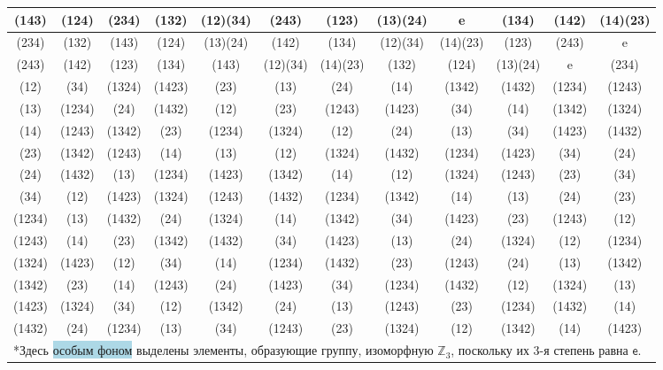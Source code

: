 \documentclass[11pt]{book}
\theoremstyle{mythm}
\theoremstyle{mydef}
\numberwithin{upr}{chapter}
\newcommand{\e}{\mathsf e}
\newcommand{\Z}{\mathbb Z}
\begin{document}
\begin{table}[h!]
\begin{tabular}{c|ccccccccccc}
(143) & (124) & (234) & (132) & (12)(34) & (243) & (123) & (13)(24) & \cellcolor{lightBlue}e & \cellcolor{lightBlue}(134) & (142) & (14)(23) \\ \hline\rowcolor{lightGreen}
(234) & (132) & (143) & (124) & (13)(24) & (142) & (134) & (12)(34) & (14)(23) & (123) & \cellcolor{lightBlue}(243) & \cellcolor{lightBlue}e \\ \hline\rowcolor{lightGreen}
(243) & (142) & (123) & (134) & (143) & (12)(34) & (14)(23) & (132) & (124) & (13)(24) & \cellcolor{lightBlue}e & \cellcolor{lightBlue}(234) \\ \hline
\cellcolor{yellow}(12) &\cellcolor{yellow} (34) &\cellcolor{yellow} (1324) &\cellcolor{yellow} (1423) & (23) & (13) & (24) & (14) & (1342) & (1432) & (1234) & (1243) \\ \hline
(13) & (1234) & (24) & (1432) & (12) & (23) & (1243) & (1423) & (34) & (14) & (1342) & (1324) \\ \hline
(14) & (1243) & (1342) & (23) & (1234) & (1324) & (12) & (24) & (13) & (34) & (1423) & (1432) \\ \hline
(23) & (1342) & (1243) & (14) & (13) & (12) & (1324) & (1432) & (1234) & (1423) & (34) & (24) \\ \hline
(24) & (1432) & (13) & (1234) & (1423) & (1342) & (14) & (12) & (1324) & (1243) & (23) & (34) \\ \hline
\cellcolor{yellow}(34) &\cellcolor{yellow} (12) &\cellcolor{yellow} (1423) &\cellcolor{yellow} (1324) & (1243) & (1432) & (1234) & (1342) & (14) & (13) & (24) & (23) \\ \hline
(1234) & (13) & (1432) & (24) & (1324) & (14) & (1342) & (34) & (1423) & (23) & (1243) & (12) \\ \hline
(1243) & (14) & (23) & (1342) & (1432) & (34) & (1423) & (13) & (24) & (1324) & (12) & (1234) \\ \hline
\cellcolor{yellow}(1324) & \cellcolor{yellow}(1423) &\cellcolor{yellow} (12) &\cellcolor{yellow} (34) & (14) & (1234) & (1432) & (23) & (1243) & (24) & (13) & (1342) \\ \hline
(1342) & (23) & (14) & (1243) & (24) & (1423) & (34) & (1234) & (1432) & (12) & (1324) & (13) \\ \hline
\cellcolor{yellow}(1423) &\cellcolor{yellow} (1324) &\cellcolor{yellow} (34) &\cellcolor{yellow} (12) & (1342) & (24) & (13) & (1243) & (23) & (1234) & (1432) & (14) \\ \hline
(1432) & (24) & (1234) & (13) & (34) & (1243) & (23) & (1324) & (12) & (1342) & (14) & (1423) \\ \hline
\multicolumn{12}{l}{*Здесь \colorbox{lightBlue}{особым фоном} выделены элементы, образующие группу, изоморфную $\Z_3$, поскольку их 3-я степень равна $\e$.}
\end{tabular}
\end{table}
\end{document}
